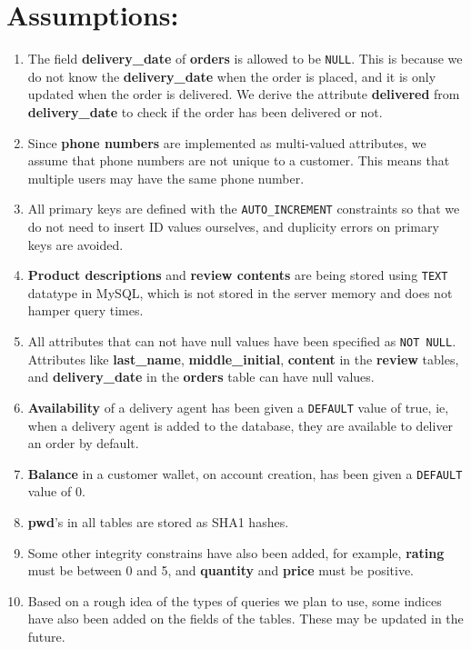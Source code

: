 \section*{Assumptions:}
\begin{enumerate}
    \item
    The field \textbf{delivery\_date} of \textbf{orders} is allowed to be \texttt{NULL}.
    This is because we do not know the \textbf{delivery\_date} when the order is placed, and it is only updated when the order is delivered.
    We derive the attribute \textbf{delivered} from \textbf{delivery\_date} to check if the order has been delivered or not.
    \item
    Since \textbf{phone numbers} are implemented as multi-valued attributes, we assume that phone numbers are not unique to a customer.
    This means that multiple users may have the same phone number.
    \item
    All primary keys are defined with the \texttt{AUTO\_INCREMENT} constraints so that we do not need to insert ID values ourselves,
    and duplicity errors on primary keys are avoided.
    \item
    \textbf{Product descriptions} and \textbf{review contents} are being stored using \texttt{TEXT} datatype in MySQL, which is not stored
    in the server memory and does not hamper query times.
    \item
    All attributes that can not have null values have been specified as \texttt{NOT NULL}. Attributes like \textbf{last\_name}, \textbf{middle\_initial},
    \textbf{content} in the \textbf{review} tables, and \textbf{delivery\_date} in the \textbf{orders} table can have null values.
    \item
    \textbf{Availability} of a delivery agent has been given a \texttt{DEFAULT} value of true, ie, when a delivery agent is added to the database,
    they are available to deliver an order by default.
    \item
    \textbf{Balance} in a customer wallet, on account creation, has been given a \texttt{DEFAULT} value of 0.
    \item
    \textbf{pwd}'s in all tables are stored as SHA1 hashes.
    \item
    Some other integrity constrains have also been added, for example, \textbf{rating} must be between 0 and 5, and \textbf{quantity}
    and \textbf{price} must be positive.
    \item
    Based on a rough idea of the types of queries we plan to use, some indices have also been added on the fields of the tables.
    These may be updated in the future.
\end{enumerate}

